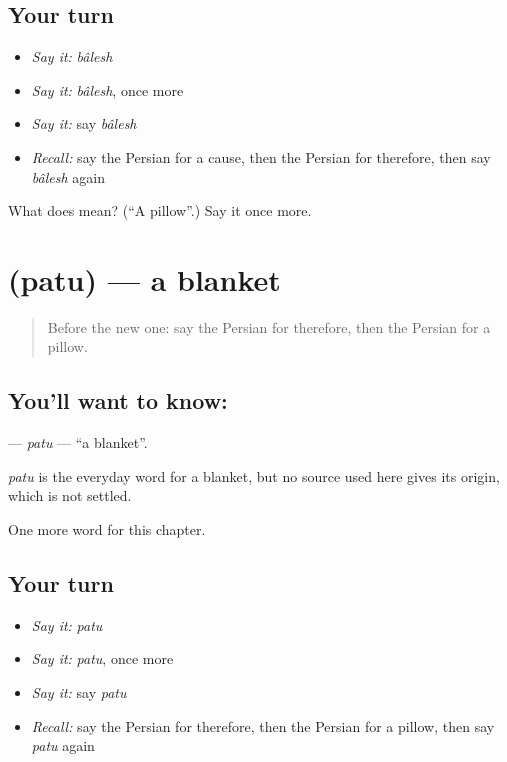 \subsection*{Your turn}
\begin{itemize}
\raggedright
  \item \emph{Say it:} \emph{bâlesh}
  \item \emph{Say it:} \emph{bâlesh}, once more
  \item \emph{Say it:} say \emph{bâlesh}
  \item \emph{Recall:} say the Persian for a cause, then the Persian for therefore, then say \emph{bâlesh} again
\end{itemize}

\begin{tcolorbox}[breakable,colback=teal!4,colframe=teal!35!black,title={Before you move on}]
What does  mean? (\textquotedblleft{}A pillow\textquotedblright{}.) Say it once more.
\end{tcolorbox}
\section[\texorpdfstring{\fa{پتو} (patu)}{پتو (patu)}]{ (patu) — a blanket}

\label{lesson:FA-C93-patu}



\begin{quote}
Before the new one: say the Persian for therefore, then the Persian for a pillow.
\end{quote}

\subsection*{You'll want to know: }
\textbf{} — \emph{patu} — \textquotedblleft{}a blanket\textquotedblright{}.

\begin{cousinweb}
\emph{patu} is the everyday word for a blanket, but no source used here gives its origin, which is not settled.
\end{cousinweb}

\begin{grammarlens}[title={What you've built}]
One more word for this chapter.
\end{grammarlens}

\subsection*{Your turn}
\begin{itemize}
\raggedright
  \item \emph{Say it:} \emph{patu}
  \item \emph{Say it:} \emph{patu}, once more
  \item \emph{Say it:} say \emph{patu}
  \item \emph{Recall:} say the Persian for therefore, then the Persian for a pillow, then say \emph{patu} again
\end{itemize}

